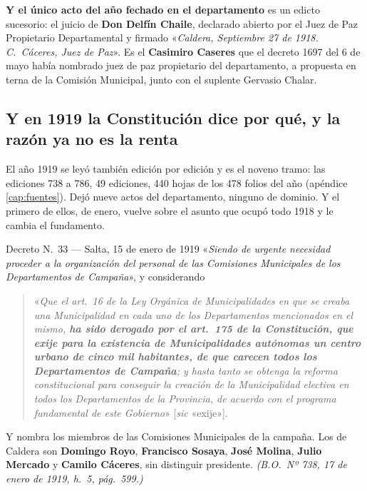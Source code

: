 \textbf{Y el único acto del año fechado en el departamento} es un edicto sucesorio: el juicio de
\textbf{Don Delfín Chaile}, declarado abierto por el Juez de Paz Propietario Departamental y
firmado «\textit{Caldera, Septiembre 27 de 1918. C.\ Cáceres, Juez de Paz}». Es el
\textbf{Casimiro Caseres} que el decreto 1697 del 6 de mayo había nombrado juez de paz
propietario del departamento, a propuesta en terna de la Comisión Municipal, junto con el
suplente Gervasio Chalar.

\subsection*{Y en 1919 la Constitución dice por qué, y la razón ya no es la renta}

El año 1919 se leyó también edición por edición y es el noveno tramo: las ediciones 738 a 786,
49 ediciones, 440 hojas de los 478 folios del año (apéndice \ref{cap:fuentes}). Dejó nueve actos
del departamento, ninguno de dominio. Y el primero de ellos, de enero, vuelve sobre el asunto que
ocupó todo 1918 y le cambia el fundamento.

\begin{ficha}{Decreto N.\ 33 --- Salta, 15 de enero de 1919}
«\textit{Siendo de urgente necesidad proceder a la organización del personal de las Comisiones
Municipales de los Departamentos de Campaña}», y considerando

\begin{quote}
«\textit{Que el art.\ 16 de la Ley Orgánica de Municipalidades en que se creaba una Municipalidad
en cada uno de los Departamentos mencionados en el mismo, \textbf{ha sido derogado por el art.\
175 de la Constitución, que exije para la existencia de Municipalidades autónomas un centro
urbano de cinco mil habitantes, de que carecen todos los Departamentos de Campaña}; y hasta tanto
se obtenga la reforma constitucional para conseguir la creación de la Municipalidad electiva en
todos los Departamentos de la Provincia, de acuerdo con el programa fundamental de este
Gobierno}» [\textit{sic} «exije»].
\end{quote}

Y nombra los miembros de las Comisiones Municipales de la campaña. Los de Caldera son
\textbf{Domingo Royo}, \textbf{Francisco Sosaya}, \textbf{José Molina}, \textbf{Julio Mercado} y
\textbf{Camilo Cáceres}, sin distinguir presidente.
\textit{(B.O.\ Nº 738, 17 de enero de 1919, h.\ 5, pág.\ 599.)}
\end{ficha}

